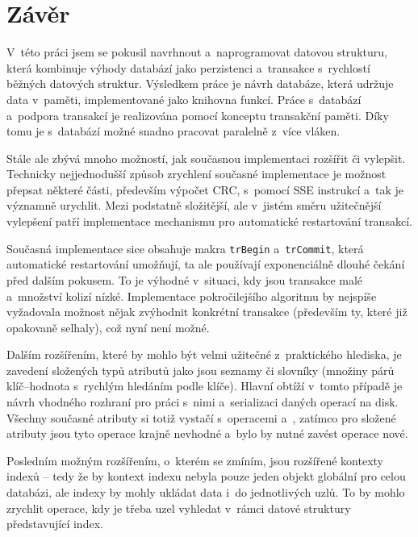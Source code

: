 \chapter*{Závěr}

V~této práci jsem se pokusil navrhnout a~naprogramovat datovou strukturu, která
kombinuje výhody databází jako perzistenci a~transakce s~rychlostí běžných datových
struktur. Výsledkem práce je návrh
databáze, která udržuje data v~paměti, implementované jako knihovna
funkcí. Práce s~databází a~podpora transakcí je realizována pomocí konceptu
transakční paměti. Díky tomu je s~databází možné snadno pracovat paralelně z~více vláken.

Stále ale zbývá mnoho možností, jak současnou implementaci rozšířit či vylepšit.
Technicky nejjednodušší způsob zrychlení současné implementace je možnost přepsat
některé části, především výpočet CRC, s~pomocí SSE instrukcí a~tak je významně urychlit.
Mezi podstatně složitější, ale v~jistém směru užitečnější vylepšení patří implementace
mechanismu pro automatické restartování transakcí. 

Současná implementace sice obsahuje
makra \verb|trBegin| a~\verb|trCommit|, která automatické restartování umožňují,
ta ale používají
exponenciálně dlouhé čekání před dalším pokusem. To
je výhodné v~situaci, kdy jsou transakce malé a~množství kolizí nízké. Implementace
pokročilejšího algoritmu by nejspíše vyžadovala možnost nějak zvýhodnit konkrétní
transakce (především ty, které již opakovaně selhaly), což nyní není možné.

Dalším rozšířením, které by mohlo být velmi užitečné z~praktického hlediska, je zavedení
složených typů atributů jako jsou seznamy či slovníky (množiny párů klíč--hodnota
s~rychlým hledáním podle klíče). Hlavní obtíží v~tomto případě je návrh vhodného
rozhraní pro práci s~nimi a~serializaci daných operací na disk. Všechny současné atributy
si totiž vystačí s~operacemi  a~,
zatímco pro složené
atributy jsou tyto operace krajně nevhodné a~bylo by nutné zavést operace nové.

Posledním možným rozšířením, o~kterém se zmíním, jsou rozšířené kontexty indexů --
tedy že by kontext indexu nebyla pouze jeden objekt globální pro celou databázi, ale
indexy by mohly ukládat data i~do jednotlivých uzlů. To by mohlo zrychlit operace,
kdy je třeba uzel vyhledat v~rámci datové struktury představující index.

